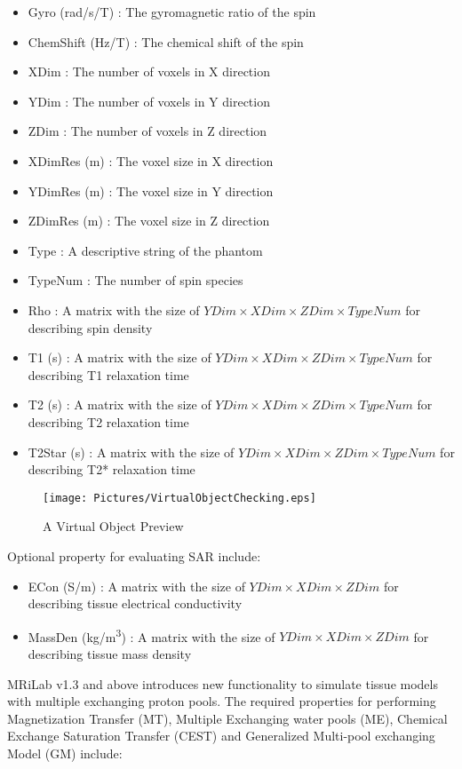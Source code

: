 \documentclass{book}%
\begin{document}
\begin{itemize}
	\item Gyro (rad/s/T) : The gyromagnetic ratio of the spin
	\item ChemShift (Hz/T) : The chemical shift of the spin
	\item XDim : The number of voxels in X direction
	\item YDim : The number of voxels in Y direction
	\item ZDim : The number of voxels in Z direction
	\item XDimRes (m) : The voxel size in X direction
	\item YDimRes (m) : The voxel size in Y direction
	\item ZDimRes (m) : The voxel size in Z direction
	\item Type : A descriptive string of the phantom
	\item TypeNum : The number of spin species
	\item Rho : A matrix with the size of $ YDim \times XDim \times ZDim \times TypeNum $ for describing spin density
	\item T1 (s) : A matrix with the size of $ YDim \times XDim \times ZDim \times TypeNum $ for describing T1 relaxation time
	\item T2 (s) : A matrix with the size of $ YDim \times XDim \times ZDim \times TypeNum $ for describing T2 relaxation time
	\item T2Star (s) : A matrix with the size of $ YDim \times XDim \times ZDim \times TypeNum $ for describing T2* relaxation time
\end{itemize}

\begin{figure}[htbp]
	\centering
		\texttt{[image: Pictures/VirtualObjectChecking.eps]}
	\caption{A Virtual Object Preview}
	\label{fig:VirtualObjectChecking}
\end{figure}

Optional property for evaluating SAR include:
\begin{itemize}
	\item ECon (S/m) : A matrix with the size of $ YDim \times XDim \times ZDim $ for describing tissue electrical conductivity
	\item MassDen (kg/m\textsuperscript{3}) : A matrix with the size of $ YDim \times XDim \times ZDim $ for describing tissue mass density
\end{itemize}

MRiLab v1.3 and above introduces new functionality to simulate tissue models with multiple exchanging proton pools. The required properties for performing Magnetization Transfer (MT), Multiple Exchanging water pools (ME), Chemical Exchange Saturation Transfer (CEST) and Generalized Multi-pool exchanging Model (GM) include:
\end{document}
